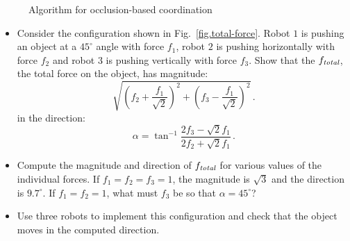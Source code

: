 \begin{figure}
\begin{center}
\end{center}
\caption{Algorithm for occlusion-based coordination}\label{fig.FSM-swarm-pushing}
\end{figure}

\begin{framed}
\begin{itemize}
\item Consider the configuration shown in Fig.~\ref{fig.total-force}. Robot $1$ is pushing an object at a $45^{\circ}$ angle with force $f_1$, robot $2$ is pushing horizontally with force $f_2$ and robot $3$ is pushing vertically with force $f_3$. Show that the $f_{\textit{\scriptsize total}}$, the total force on the object, has magnitude:
\[
\sqrt{\left(f_2+\frac{f_1}{\sqrt{2}}\right)^2+\left(f_3-\frac{f_1}{\sqrt{2}}\right)^2}\,.
\]
in the direction:
\[
\alpha = \tan^{-1} \frac{2f_3-\sqrt{2}f_1}{2f_2+\sqrt{2}f_1}\,.
\]
\item Compute the magnitude and direction of $f_{\textit{\scriptsize total}}$ for various values of the individual forces. If $f_1=f_2=f_3=1$, the magnitude is $\sqrt{3}$ and the direction is $9.7^{\circ}$. If $f_1=f_2=1$, what must $f_3$ be so that $\alpha=45^{\circ}$?
\item Use three robots to implement this configuration and check that the object moves in the computed direction.
\end{itemize}
\end{framed}


